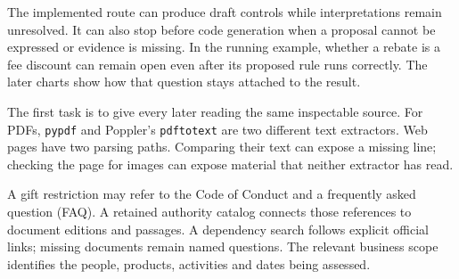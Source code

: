\documentclass[12pt,a4paper,oneside,openany]{book}
\begin{document}
The implemented route can produce draft controls while interpretations remain
unresolved. It can also stop before code generation when a proposal cannot be
expressed or evidence is missing. In the running example, whether a rebate is
a fee discount can remain open even after its proposed rule runs correctly.
The later charts show how that question stays attached to the result.

\clearpage
{}
The first task is to give every later reading the same inspectable source.
For PDFs, \texttt{pypdf} and Poppler's \texttt{pdftotext} are two different text
extractors. Web pages have two parsing paths. Comparing their text can expose
a missing line; checking the page for images can expose material that neither
extractor has read.

\begin{MapDiagram}
\end{MapDiagram}

A gift restriction may refer to the Code of Conduct and a frequently asked
question (FAQ). A retained authority catalog connects those references to
document editions and passages. A dependency search follows explicit official
links; missing documents remain named questions. The relevant business scope
identifies the people, products, activities and dates being assessed.
\end{document}

